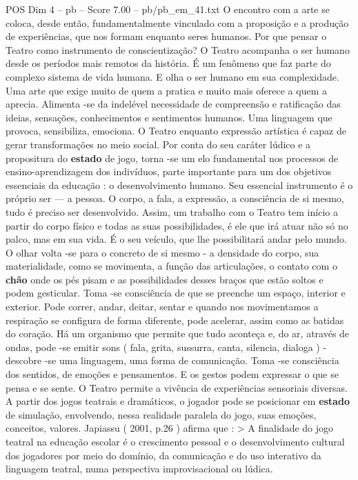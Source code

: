 \begin{textsample}{POS Dim 4 – pb – Score 7.00 – pb/pb\_em\_41.txt}
O encontro com a arte se coloca, desde então, fundamentalmente vinculado com a proposição e a produção de experiências, que nos formam enquanto seres humanos.
Por que pensar o Teatro como instrumento de conscientização?
O Teatro acompanha o ser humano desde os períodos mais remotos da história.
É um fenômeno que faz parte do complexo sistema de vida humana.
E olha o ser humano em sua complexidade.
Uma arte que exige muito de quem a pratica e muito mais oferece a quem a aprecia.
Alimenta -se da indelével necessidade de compreensão e ratificação das ideias, sensações, conhecimentos e sentimentos humanos.
Uma linguagem que provoca, sensibiliza, emociona.
O Teatro enquanto expressão artística é capaz de gerar transformações no meio social.
Por conta do seu caráter lúdico e a propositura do \textbf{estado} de jogo, torna -se um elo fundamental nos processos de ensino-aprendizagem dos indivíduos, parte importante para um dos objetivos essenciais da educação : o desenvolvimento humano.
Seu essencial instrumento é o próprio ser — a pessoa.
O corpo, a fala, a expressão, a consciência de si mesmo, tudo é preciso ser desenvolvido.
Assim, um trabalho com o Teatro tem início a partir do corpo físico e todas as suas possibilidades, é ele que irá atuar não só no palco, mas em sua vida.
É o seu veículo, que lhe possibilitará andar pelo mundo.
O olhar volta -se para o concreto de si mesmo - a densidade do corpo, sua materialidade, como se movimenta, a função das articulações, o contato com o \textbf{chão} onde os pés pisam e as possibilidades desses braços que estão soltos e podem gesticular.
Toma -se consciência de que se preenche um espaço, interior e exterior.
Pode correr, andar, deitar, sentar e quando nos movimentamos a respiração se configura de forma diferente, pode acelerar, assim como as batidas do coração.
Há um organismo que permite que tudo aconteça e, do ar, através de ondas, pode -se emitir sons ( fala, grita, sussurra, canta, silencia, dialoga ) - descobre -se uma linguagem, uma forma de comunicação.
Toma -se consciência dos sentidos, de emoções e pensamentos.
E os gestos podem expressar o que se pensa e se sente.
O Teatro permite a vivência de experiências sensoriais diversas.
A partir dos jogos teatrais e dramáticos, o jogador pode se posicionar em \textbf{estado} de simulação, envolvendo, nessa realidade paralela do jogo, suas emoções, conceitos, valores.
Japiassu ( 2001, p.26 ) afirma que : > A finalidade do jogo teatral na educação escolar é o crescimento pessoal e o desenvolvimento cultural dos jogadores por meio do domínio, da comunicação e do uso interativo da linguagem teatral, numa perspectiva improvisacional ou lúdica.

\end{textsample}
